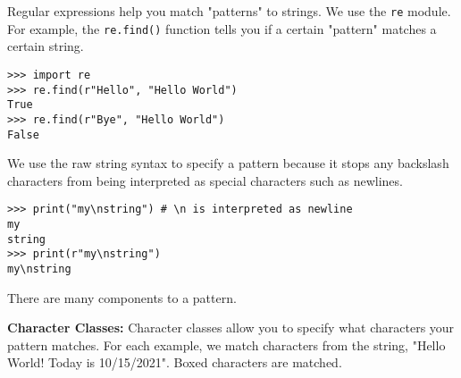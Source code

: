 Regular expressions help you match "patterns" to strings. We use the \lstinline{re} module.
For example, the \lstinline{re.find()} function tells you if a certain "pattern" matches a certain string.

\begin{lstlisting}
>>> import re
>>> re.find(r"Hello", "Hello World")
True
>>> re.find(r"Bye", "Hello World")
False
\end{lstlisting}

We use the raw string syntax to specify a pattern because
it stops any backslash characters from being interpreted as special characters such as newlines.

\begin{lstlisting}
>>> print("my\nstring") # \n is interpreted as newline
my
string
>>> print(r"my\nstring")
my\nstring
\end{lstlisting}

There are many components to a pattern.

\textbf{Character Classes:}
Character classes allow you to specify what characters your pattern matches.
For each example, we match characters from the string, "Hello World! Today is 10/15/2021".
Boxed characters are matched.

